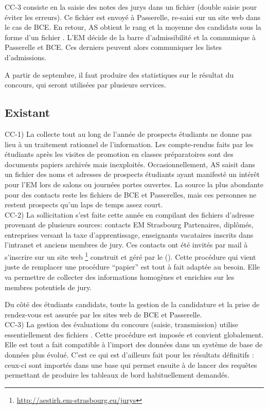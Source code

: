 \documentclass{book}
\begin{document}
CC-3 consiste en la saisie des notes des jurys dans un fichier
 (double saisie pour éviter les erreurs). Ce fichier est 
envoyé à Passerelle, re-saisi sur un site web dans le cas de BCE.
En retour, AS obtient le rang et la moyenne des candidats sous
la forme d'un fichier . L'EM décide de la barre d'admissibilité
et la communique à Passerelle et BCE. Ces derniers peuvent alors
communiquer les listes d'admissions.

A partir de septembre, il faut produire des statistiques sur le
résultat du concours, qui seront utilisées par plusieurs services.


\subsection{Existant}
CC-1) 
La collecte tout au long de l'année de prospects étudiants
ne donne pas lieu à un traitement rationnel de l'information.
Les compte-rendus faits par les étudiants après les visites de
promotion en classes préparatoires sont des documents papiers
archivés mais inexploités. Occasionnellement, AS saisit dans un
fichier  des noms et adresses de prospects étudiants ayant 
manifesté un intérêt pour l'EM lors de salons ou journées portes 
ouvertes. La source la plus abondante pour des contacts reste
les fichiers de BCE et Passerelles, mais ces personnes ne restent
prospects qu'un laps de temps assez court.\\


CC-2)
La sollicitation s'est faite cette année en compilant des
fichiers d'adresse provenant de plusieurs sources: contacts
EM Strasbourg Partenaires, diplômés, entreprises versant la
taxe d'apprentissage, enseignants vacataires inscrits dans
l'intranet et anciens membres de jury. Ces contacts ont été
invités par mail à s'inscrire sur un site web%
\footnote{\url{http://aestirh.em-strasbourg.eu/jurys}}
construit et géré par le \scom (\NB).
Cette procédure qui vient juste de remplacer une procédure
``papier'' est tout à fait adaptée au besoin. Elle va permettre
de collecter des informations homogènes et enrichies sur les
membres potentiels de jury.

Du côté des étudiants candidats, toute la gestion de la 
candidature et la prise de rendez-vous est assurée par 
les sites web de BCE et Passerelle.\\

CC-3) 
La gestion des évaluations du concours (saisie, transmission)
utilise essentiellement des fichiers . Cette procédure
est imposée et convient globalement. Elle est tout a fait 
compatible à l'import des données dans un système de base de
données plus évolué.
C'est ce qui est d'ailleurs fait pour les résultats définitifs :
ceux-ci sont importés dans une base  qui permet ensuite
à \CK de lancer des requêtes permettant de produire les tableaux
de bord habituellement demandés. 
\end{document}
